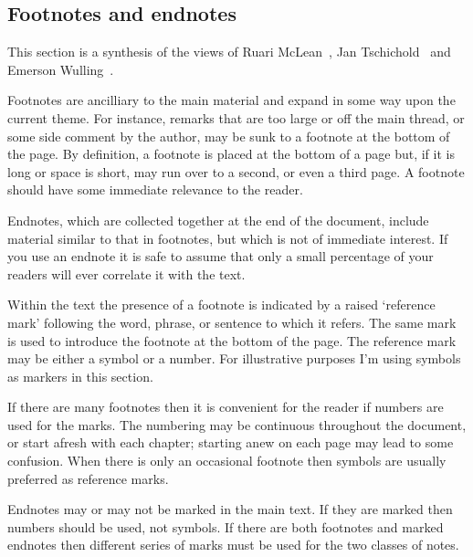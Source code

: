 \documentclass[10pt,letterpaper,extrafontsizes]{memoir}
\begin{document}
\subsection{Footnotes and endnotes}

\renewcommand*{\thefootnote}{\fnsymbol{footnote}}
\let\oldfootnoterule\footnoterule
\renewcommand*{\footnoterule}{}


    This section is a synthesis of the views of Ruari McLean~\autocite{MCLEAN80},
Jan Tschichold~\autocite{TSCHICHOLD91} and 
Emerson Wulling~\autocite{WULLING-FOOTNOTES}.

    Footnotes are ancilliary to the main material and 
expand in some way
upon the current theme. For instance, remarks that are too large or off the
main thread, or some side comment by the author, may be sunk to a footnote 
at the bottom of the page. By definition, a footnote is placed at the 
bottom of a page but, if it is long or space is short, may run over to a 
second, or even a third page. A footnote should have some immediate 
relevance to the reader.

Endnotes, which are collected together at the end of the 
document, include 
material similar to that in footnotes, but which is not of immediate interest.
If you use an endnote it is safe to assume that only a small 
percentage of your readers will ever correlate it with the text.
 
    Within the text the presence of a footnote is indicated by a raised 
`reference mark' following the
word, phrase, or sentence to which it refers. The same mark is used 
to introduce the footnote at the bottom of the page.
The reference mark may be either a 
symbol or a number. For illustrative purposes I'm using symbols
as markers in this section.

   If there are many footnotes then it is convenient for the reader if numbers 
are used for the marks. The numbering may be continuous 
throughout the document,
or start afresh with each chapter; starting anew on each page may lead to
some confusion. When there is only an occasional footnote then symbols 
are usually preferred as reference marks.

    Endnotes may or may not be marked in the main text. 
If they are marked then numbers
should be used, not symbols. If there are both footnotes and marked endnotes 
then different series of marks must be used for the two classes of notes.
\end{document}
